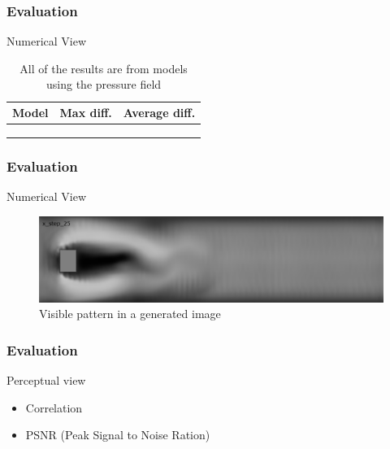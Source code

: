 \documentclass[18pt, xcolor=table]{beamer}
\begin{document}
\begin{frame}[t]
  \frametitle{Evaluation}
  \large{Numerical View}
  \vspace{1.5cm}
  \begin{center}
    \begin{table}
      \begin{tabular}{|c|c|c|}
        \hline
        \rowcolor{blue!50}
        \textbf{Model}                       & \textbf{Max diff.} & \textbf{Average diff.} \\
        \hline
        \color{gray!!140}{Constant}          & \color{gray!!140}{14.56\%} & \color{gray!!140}{0.60\%}  \\
        \rowcolor{gray!50}
        \color{red}{Inflow speed}            & \color{red}{32.16\%} & \color{red}{0.55\%}  \\
        \color{gray!!140}{Viscosity-density} & \color{gray!!140}{57.00\%} & \color{gray!!140}{13.85\%} \\
        \hline
      \end{tabular}
      \caption{All of the results are from models using the pressure field}
    \end{table}
  \end{center}
\end{frame}

\begin{frame}[t]
  \frametitle{Evaluation}
  \large{Numerical View}
  \vspace{1.5cm}
  \begin{figure}[htb]
    \includegraphics[scale=0.29]{images/bad_pattern}
    \caption{Visible pattern in a generated image}
  \end{figure}
\end{frame}

\begin{frame}[t]
  \frametitle{Evaluation}
  \large{Perceptual view}
  \begin{itemize}
  \item Correlation
  \item PSNR (Peak Signal to Noise Ration)
  \end{itemize}
\end{frame}
\end{document}
